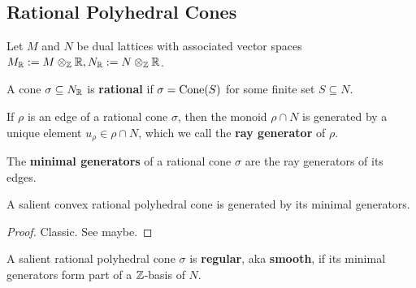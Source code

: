 \subsection{Rational Polyhedral Cones}


Let $M$ and $N$ be dual lattices with associated vector spaces $M_{\mathbb R} := M \otimes_{\mathbb Z} {\mathbb R}, N_{\mathbb R} := N \otimes_{\mathbb Z} {\mathbb R}$.


\begin{definition}
  \label{1-2-14-rat-cone}

  A cone $\sigma \subseteq N_{\mathbb R}$ is {\bf rational} if $\sigma = \operatorname{Cone}(S)$ for some finite set $S \subseteq N$.
\end{definition}


\begin{definition}
  \label{1-2-ray-gen}

  If $\rho$ is an edge of a rational cone $\sigma$, then the monoid $\rho \cap N$ is generated by a unique element $u_\rho \in \rho \cap N$, which we call the {\bf ray generator} of $\rho$.
\end{definition}


\begin{definition}
  \label{1-2-min-gen}

  The {\bf minimal generators} of a rational cone $\sigma$ are the ray generators of its edges.
\end{definition}


\begin{lemma}
  \label{1-2-15-cone-hull-min-gen}

  A salient convex rational polyhedral cone is generated by its minimal generators.
\end{lemma}
\begin{proof}
  \uses{}

  Classic. See \cite{Oda_1988} maybe.
\end{proof}


\begin{definition}
  \label{1-2-16-reg-cone}

  A salient rational polyhedral cone $\sigma$ is {\bf regular}, aka {\bf smooth}, if its minimal generators form part of a ${\mathbb Z}$-basis of $N$.
\end{definition}



